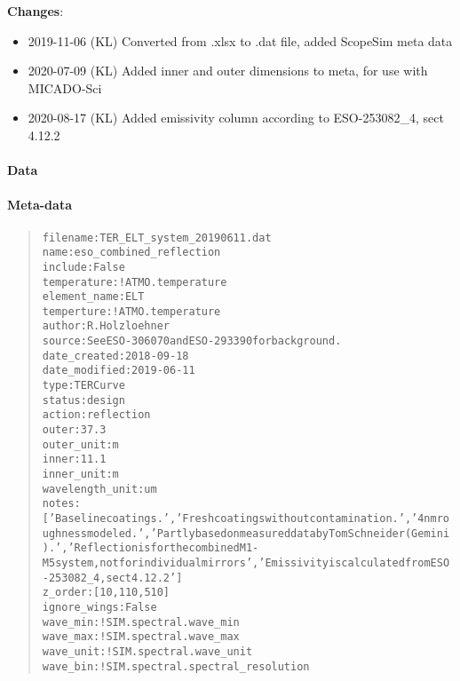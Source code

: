 \textbf{Changes}:

\begin{itemize}
\item 2019-11-06 (KL) Converted from .xlsx to .dat file, added ScopeSim meta data

\item 2020-07-09 (KL) Added inner and outer dimensions to meta, for use with MICADO-Sci

\item 2020-08-17 (KL) Added emissivity column according to ESO-253082\_4, sect 4.12.2
\end{itemize}


\paragraph{Data%
  \label{id3}%
}


\paragraph{Meta-data%
  \label{id4}%
}

\begin{quote}
\begin{alltt}
       filename : TER_ELT_system_20190611.dat
           name : eso_combined_reflection
        include : False
    temperature : !ATMO.temperature
   element_name : ELT
     temperture : !ATMO.temperature
         author : R. Holzloehner
         source : See ESO-306070 and ESO-293390 for background.
   date_created : 2018-09-18
  date_modified : 2019-06-11
           type : TERCurve
         status : design
         action : reflection
          outer : 37.3
     outer_unit : m
          inner : 11.1
     inner_unit : m
wavelength_unit : um
          notes : ['Baseline coatings.', 'Fresh coatings without contamination.', '4nm roughness modeled.', 'Partly based on measured data by Tom Schneider (Gemini).', 'Reflection is for the combined M1-M5 system, not for individual mirrors', 'Emissivity is calculated from ESO-253082_4, sect 4.12.2']
        z_order : [10, 110, 510]
   ignore_wings : False
       wave_min : !SIM.spectral.wave_min
       wave_max : !SIM.spectral.wave_max
      wave_unit : !SIM.spectral.wave_unit
       wave_bin : !SIM.spectral.spectral_resolution
\end{alltt}
\end{quote}
